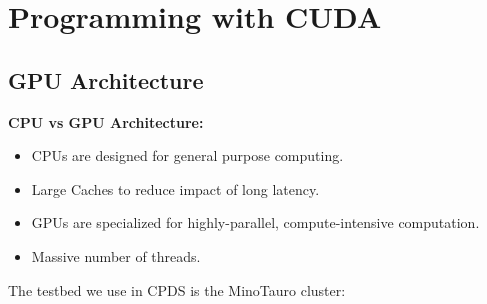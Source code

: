 \section{Programming with CUDA}

\subsection{GPU Architecture}
\textbf{CPU vs GPU Architecture:}
\begin{multicols}{2}
    \begin{itemize}
        \item  CPUs are designed for general purpose computing.
        \item Large Caches to reduce impact of long latency.
        \item GPUs are specialized for highly-parallel, compute-intensive computation.
        \item Massive number of threads.
    \end{itemize}
\end{multicols}
The testbed we use in CPDS is the MinoTauro cluster:
